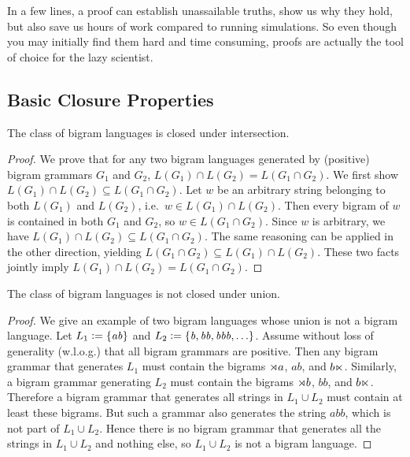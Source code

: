 In a few lines, a proof can establish unassailable truths, show us why they hold, but also save us hours of work compared to running simulations.
So even though you may initially find them hard and time consuming, proofs are actually the tool of choice for the lazy scientist.


\subsection{Basic Closure Properties}

\begin{lemma}
    The class of bigram languages is closed under intersection.
\end{lemma}
%
\begin{proof}
    We prove that for any two bigram languages generated by (positive) bigram grammars $G_1$ and $G_2$, $L(G_1) \cap L(G_2) = L(G_1 \cap G_2)$.
    We first show $L(G_1) \cap L(G_2) \subseteq L(G_1 \cap G_2)$.
    Let $w$ be an arbitrary string belonging to both $L(G_1)$ and $L(G_2)$, i.e.\ $w \in L(G_1) \cap L(G_2)$.
    Then every bigram of $w$ is contained in both $G_1$ and $G_2$, so $w \in L(G_1 \cap G_2)$.
    Since $w$ is arbitrary, we have $L(G_1) \cap L(G_2) \subseteq L(G_1 \cap G_2)$.
    The same reasoning can be applied in the other direction, yielding $L(G_1 \cap G_2) \subseteq L(G_1) \cap L(G_2)$.
    These two facts jointly imply $L(G_1) \cap L(G_2) = L(G_1 \cap G_2)$.
\end{proof}
%

\begin{lemma}
    The class of bigram languages is not closed under union. 
\end{lemma}
%
\begin{proof}
    We give an example of two bigram languages whose union is not a bigram language.
    Let $L_1 \mathrel{\mathop:}= \left \{ \mathit{ab} \right \}$ and $L_2 \mathrel{\mathop:}= \left \{ \mathit{b}, \mathit{bb}, \mathit{bbb}, \ldots \right \}$.
    Assume without loss of generality (w.l.o.g.) that all bigram grammars are positive.
    Then any bigram grammar that generates $L_1$ must contain the bigrams $\rtimes a$, $\mathit{ab}$, and $b \ltimes$.
    Similarly, a bigram grammar generating $L_2$ must contain the bigrams $\rtimes b$, $\mathit{bb}$, and $b \ltimes$.
    Therefore a bigram grammar that generates all strings in $L_1 \cup L_2$ must contain at least these bigrams.
    But such a grammar also generates the string $\mathit{abb}$, which is not part of $L_1 \cup L_2$.
    Hence there is no bigram grammar that generates all the strings in $L_1 \cup L_2$ and nothing else, so $L_1 \cup L_2$ is not a bigram language.
\end{proof}
%

